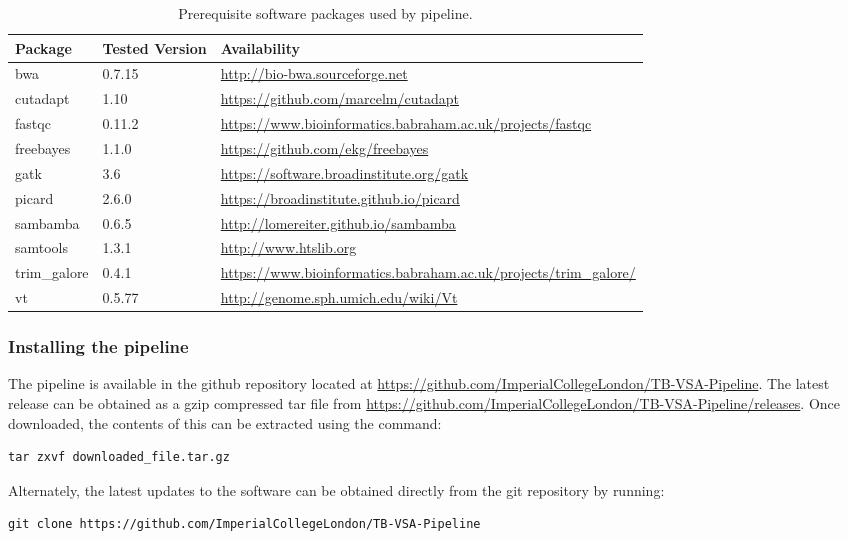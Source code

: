 \documentclass[a4paper,10pt,twoside]{article}
\begin{document}
\begin{table}
{\scriptsize
\begin{tabularx}{400pt}{@{}lll@{}}\toprule
Package	& Tested Version & Availability \\\midrule
bwa		    &	0.7.15 & \url{http://bio-bwa.sourceforge.net} \\
cutadapt	&	1.10  & \url{https://github.com/marcelm/cutadapt} \\
fastqc		&	0.11.2 & \url{https://www.bioinformatics.babraham.ac.uk/projects/fastqc} \\
freebayes	&	1.1.0 & \url{https://github.com/ekg/freebayes} \\
gatk		&	3.6 & \url{https://software.broadinstitute.org/gatk} \\
picard		&	2.6.0 & \url{https://broadinstitute.github.io/picard} \\
sambamba	&	0.6.5 & \url{http://lomereiter.github.io/sambamba}\\
samtools	&	1.3.1 & \url{http://www.htslib.org} \\
trim\_galore	&	0.4.1 & \url{https://www.bioinformatics.babraham.ac.uk/projects/trim\_galore/} \\
vt	&	0.5.77 & \url{http://genome.sph.umich.edu/wiki/Vt} \\\hline
\end{tabularx}}{}
\caption{Prerequisite software packages used by pipeline.\label{tab:01}} 
\end{table}

\subsubsection{Installing the pipeline}

The pipeline is available in the github repository located at
\url{https://github.com/ImperialCollegeLondon/TB-VSA-Pipeline}. The latest
release can be obtained as a gzip compressed tar file from
\url{https://github.com/ImperialCollegeLondon/TB-VSA-Pipeline/releases}. Once downloaded, the contents of this can be extracted using the command:

\begin{verbatim}
tar zxvf downloaded_file.tar.gz
\end{verbatim}

Alternately, the latest updates to the software can be obtained directly from the git repository by running:

\begin{verbatim}
git clone https://github.com/ImperialCollegeLondon/TB-VSA-Pipeline
\end{verbatim}
\end{document}
